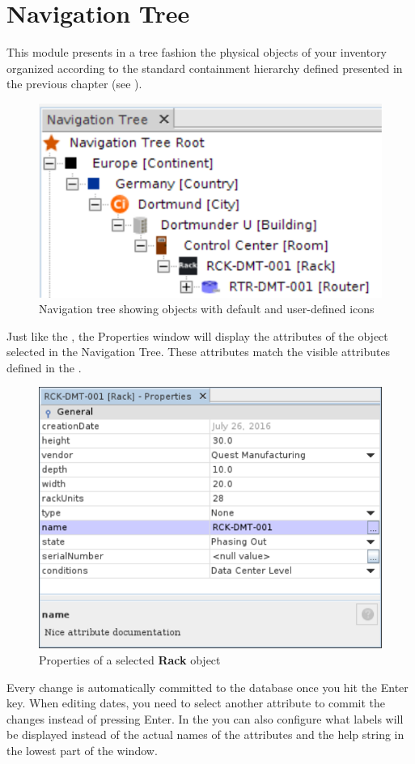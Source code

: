 \documentclass[a4paper]{article}
\begin{document}
	\section{Navigation Tree} \label{sec:navigation_tree}
	This module presents in a tree fashion the physical objects of your inventory organized according to the standard containment hierarchy defined presented in the previous chapter (see \textbf{}).
	\begin{figure}[h!]
		\centering
		\includegraphics[width=0.4\linewidth]{img/navigation_tree.png}
		\caption{Navigation tree showing objects with default and user-defined icons}
		\label{fig:navigation_tree}
	\end{figure}
	Just like the , the Properties window will display the attributes of the object selected in the Navigation Tree. These attributes match the visible attributes defined in the \textbf{}.
	\begin{figure}[h!]
		\centering
		\includegraphics[width=0.5\linewidth]{img/navigation_tree_properties.png}
		\caption{Properties of a selected \textbf{Rack} object}
		\label{fig:navigation_tree_properties}
	\end{figure}
	Every change is automatically committed to the database once you hit the Enter key. When editing dates, you need to select another attribute to commit the changes instead of pressing Enter. In the \textbf{} you can also configure what labels will be displayed instead of the actual names of the attributes and the help string in the lowest part of the window.\newline
	
\end{document}
